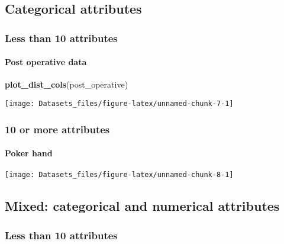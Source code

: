 \documentclass[]{article}
\newenvironment{Shaded}{\begin{snugshade}}{\end{snugshade}}
\newcommand{\KeywordTok}[1]{\textcolor[rgb]{0.13,0.29,0.53}{\textbf{#1}}}
\newcommand{\NormalTok}[1]{#1}
\let\oldparagraph\paragraph
\renewcommand{\paragraph}[1]{\oldparagraph{#1}\mbox{}}
\begin{document}
\hypertarget{categorical-attributes-1}{%
\subsection{Categorical attributes}\label{categorical-attributes-1}}

\hypertarget{less-than-10-attributes-3}{%
\subsubsection{Less than 10
attributes}\label{less-than-10-attributes-3}}

\hypertarget{Post-operative}{%
\paragraph{Post operative data}\label{Post-operative}}

\begin{Shaded}
\begin{Highlighting}[]
\KeywordTok{plot_dist_cols}\NormalTok{(post_operative)}
\end{Highlighting}
\end{Shaded}

\texttt{[image: Datasets\_files/figure-latex/unnamed-chunk-7-1]}

\hypertarget{or-more-attributes-3}{%
\subsubsection{10 or more attributes}\label{or-more-attributes-3}}

\hypertarget{Poker-hand}{%
\paragraph{Poker hand}\label{Poker-hand}}

\texttt{[image: Datasets\_files/figure-latex/unnamed-chunk-8-1]}

\hypertarget{mixed-categorical-and-numerical-attributes-1}{%
\subsection{Mixed: categorical and numerical
attributes}\label{mixed-categorical-and-numerical-attributes-1}}

\hypertarget{less-than-10-attributes-4}{%
\subsubsection{Less than 10
attributes}\label{less-than-10-attributes-4}}
\end{document}
